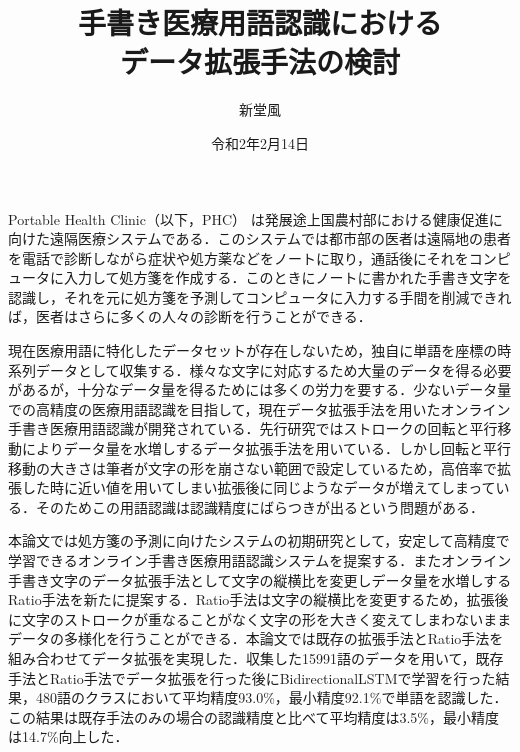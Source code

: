 \documentclass[a4j,11pt]{jreport}
\title{手書き医療用語認識における\\データ拡張手法の検討}
\author{新堂風}
\date{令和2年2月14日}
\begin{document}
\maketitle

Portable Health Clinic（以下，PHC） は発展途上国農村部における健康促進に向けた遠隔医療システムである．このシステムでは都市部の医者は遠隔地の患者を電話で診断しながら症状や処方薬などをノートに取り，通話後にそれをコンピュータに入力して処方箋を作成する．このときにノートに書かれた手書き文字を認識し，それを元に処方箋を予測してコンピュータに入力する手間を削減できれば，医者はさらに多くの人々の診断を行うことができる．

現在医療用語に特化したデータセットが存在しないため，独自に単語を座標の時系列データとして収集する．様々な文字に対応するため大量のデータを得る必要があるが，十分なデータ量を得るためには多くの労力を要する．少ないデータ量での高精度の医療用語認識を目指して，現在データ拡張手法を用いたオンライン手書き医療用語認識が開発されている．先行研究ではストロークの回転と平行移動によりデータ量を水増しするデータ拡張手法を用いている．しかし回転と平行移動の大きさは筆者が文字の形を崩さない範囲で設定しているため，高倍率で拡張した時に近い値を用いてしまい拡張後に同じようなデータが増えてしまっている．そのためこの用語認識は認識精度にばらつきが出るという問題がある．

本論文では処方箋の予測に向けたシステムの初期研究として，安定して高精度で学習できるオンライン手書き医療用語認識システムを提案する．またオンライン手書き文字のデータ拡張手法として文字の縦横比を変更しデータ量を水増しするRatio手法を新たに提案する．Ratio手法は文字の縦横比を変更するため，拡張後に文字のストロークが重なることがなく文字の形を大きく変えてしまわないままデータの多様化を行うことができる．本論文では既存の拡張手法とRatio手法を組み合わせてデータ拡張を実現した．収集した15991語のデータを用いて，既存手法とRatio手法でデータ拡張を行った後にBidirectionalLSTMで学習を行った結果，480語のクラスにおいて平均精度93.0\%，最小精度92.1\%で単語を認識した．この結果は既存手法のみの場合の認識精度と比べて平均精度は3.5\%，最小精度は14.7\%向上した．

\preseninfo
\end{document}
